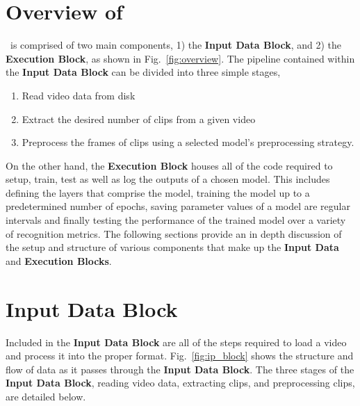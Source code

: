 \documentclass{llncs}
\begin{document}
\section{Overview of \acro}
\label{sec:overview}



\acro~is comprised of two main components, 1) the \textbf{Input Data Block}, and 2) the \textbf{Execution Block}, as shown in Fig.~\ref{fig:overview}.
The pipeline contained within the \textbf{Input Data Block} can be divided into three simple stages,
\begin{enumerate}
\item Read video data from disk
\item Extract the desired number of clips from a given video
\item Preprocess the frames of clips using a selected model's preprocessing strategy.
\end{enumerate}
On the other hand, the \textbf{Execution Block} houses all of the code required to setup, train, test as well as log the outputs of a chosen model.
This includes defining the layers that comprise the model, training the model up to a predetermined number of epochs, saving parameter values of a model are regular intervals and finally testing the performance of the trained model over a variety of recognition metrics.
The following sections provide an in depth discussion of the setup and structure of various components that make up the \textbf{Input Data} and \textbf{Execution Blocks}.

\section{Input Data Block}
\label{sec:ipblock}
Included in the \textbf{Input Data Block} are all of the steps required to load a video and process it into the proper format.
Fig.~\ref{fig:ip_block} shows the structure and flow of data as it passes through the \textbf{Input Data Block}.
The three stages of the \textbf{Input Data Block}, reading video data, extracting clips, and preprocessing clips, are detailed below.
\end{document}

